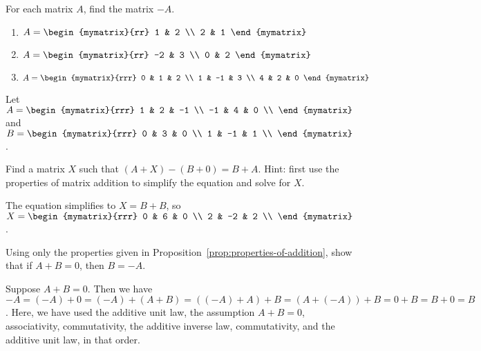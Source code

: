 \begin{ex}
  For each matrix $A$, find the matrix $-A$.
  \begin{enumerate}
  \item
    $A = \begin{mymatrix}{rr}
      1 & 2 \\
      2 & 1
    \end{mymatrix}$

  \item
    $A = \begin{mymatrix}{rr}
      -2 & 3 \\
      0 & 2
    \end{mymatrix}$

  \item
    $A = \begin{mymatrix}{rrr}
      0 & 1 & 2 \\
      1 & -1 & 3 \\
      4 & 2 & 0
    \end{mymatrix}$
  \end{enumerate}
\end{ex}

\begin{ex}
  Let $A = \begin{mymatrix}{rrr}
    1 & 2 & -1 \\
    -1 & 4 & 0 \\
  \end{mymatrix}$ and
  $B = \begin{mymatrix}{rrr}
    0 & 3 & 0 \\
    1 & -1 & 1 \\
  \end{mymatrix}$.\par\noindent
  Find a matrix $X$ such that $(A+X)-(B+0) = B+A$. Hint: first use
  the properties of matrix addition to simplify the equation and
  solve for $X$.
  \begin{sol}
    The equation simplifies to $X=B+B$, so $X = \begin{mymatrix}{rrr}
    0 & 6 & 0 \\
    2 & -2 & 2 \\
    \end{mymatrix}$.
  \end{sol}
\end{ex}

\begin{ex}\label{add-inv-rst-unique}
  Using only the properties given in
  Proposition~\ref{prop:properties-of-addition}, show that if $A+B=0$, then
  $B=-A$.
  \begin{sol}
    Suppose $A+B=0$. Then we have
    $-A = (-A)+0 = (-A)+(A+B) = ((-A)+A)+B = (A+(-A))+B = 0+B = B+0 =
    B$.  Here, we have used the additive unit law, the assumption
    $A+B=0$, associativity, commutativity, the additive inverse law,
    commutativity, and the additive unit law, in that order.
  \end{sol}
\end{ex}

